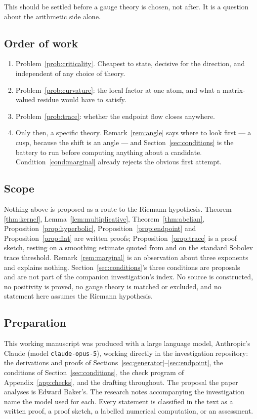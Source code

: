 This should be settled before a gauge theory is chosen, not after. It is a
question about the arithmetic side alone.

\subsection{Order of work}

\begin{enumerate}
\item Problem~\ref{prob:criticality}. Cheapest to state, decisive for the
direction, and independent of any choice of theory.
\item Problem~\ref{prob:curvature}: the local factor at one atom, and what a
matrix-valued residue would have to satisfy.
\item Problem~\ref{prob:trace}: whether the endpoint flow closes anywhere.
\item Only then, a specific theory. Remark~\ref{rem:angle} says where to look
first --- a cusp, because the shift is an angle --- and
Section~\ref{sec:conditions} is the battery to run before computing anything
about a candidate. Condition~\ref{cond:marginal} already rejects the obvious
first attempt.
\end{enumerate}

\subsection{Scope}

Nothing above is proposed as a route to the Riemann hypothesis. Theorem
\ref{thm:kernel}, Lemma~\ref{lem:multiplicative}, Theorem~\ref{thm:abelian},
Proposition~\ref{prop:hyperbolic}, Proposition~\ref{prop:endpoint} and
Proposition~\ref{prop:flat} are written proofs; Proposition~\ref{prop:trace} is a
proof sketch, resting on a smoothing estimate quoted from \cite{Background} and
on the standard Sobolev trace threshold. Remark~\ref{rem:marginal} is an
observation about three exponents and explains nothing.
Section~\ref{sec:conditions}'s three conditions are proposals and are not part of
the companion investigation's index. No source is constructed, no positivity is
proved, no gauge theory is matched or excluded, and no statement here assumes the
Riemann hypothesis.

\subsection*{Preparation}

This working manuscript was produced with a large language model, Anthropic's
Claude (model \texttt{claude-opus-5}), working directly in the investigation
repository: the derivations and proofs of
Sections~\ref{sec:generator}--\ref{sec:endpoint}, the conditions of
Section~\ref{sec:conditions}, the check program of Appendix~\ref{app:checks}, and
the drafting throughout. The proposal the paper analyses is Edward Baker's. The
research notes accompanying the investigation name the model used for each. Every
statement is classified in the text as a written proof, a proof sketch, a
labelled numerical computation, or an assessment.
